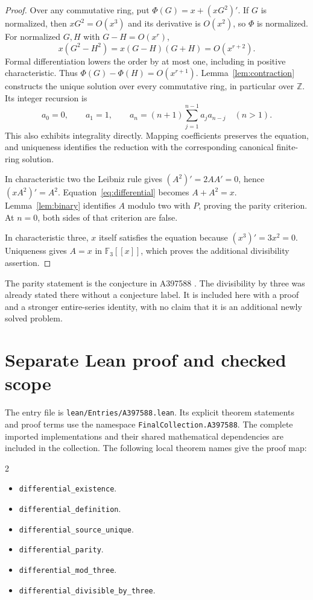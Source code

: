 \documentclass[11pt,a4paper]{article}
\theoremstyle{remark}
\newcommand{\Z}{\mathbb Z}
\newcommand{\F}{\mathbb F}
\newcommand{\ps}[1]{#1[[x]]}
\begin{document}
\begin{proof}
Over any commutative ring, put $\Phi(G)=x+(xG^2)'$. If $G$ is normalized,
then $xG^2=O(x^3)$ and its derivative is $O(x^2)$, so $\Phi$ is normalized.
For normalized $G,H$ with $G-H=O(x^r)$,
\[
 x(G^2-H^2)=x(G-H)(G+H)=O(x^{r+2}).
\]
Formal differentiation lowers the order by at most one, including in
positive characteristic. Thus $\Phi(G)-\Phi(H)=O(x^{r+1})$.
Lemma~\ref{lem:contraction} constructs the unique solution over every
commutative ring, in particular over $\Z$. Its integer recursion is
\[
 a_0=0,\qquad a_1=1,\qquad
 a_n=(n+1)\sum_{j=1}^{n-1}a_ja_{n-j}\quad(n>1).
\]
This also exhibits integrality directly. Mapping coefficients preserves
the equation, and uniqueness identifies the reduction with the
corresponding canonical finite-ring solution.

In characteristic two the Leibniz rule gives $(A^2)'=2AA'=0$, hence
$(xA^2)'=A^2$. Equation~\eqref{eq:differential} becomes $A+A^2=x$.
Lemma~\ref{lem:binary} identifies $A$ modulo two with $P$, proving the
parity criterion. At $n=0$, both sides of that criterion are false.

In characteristic three, $x$ itself satisfies the equation because
$(x^3)'=3x^2=0$. Uniqueness gives $A=x$ in $\ps{\F_3}$, which proves the
additional divisibility assertion.
\end{proof}

The parity statement is the conjecture in A397588 \cite{oeis588}.
The divisibility by three was already stated there without a conjecture
label. It is included here with a proof and a stronger entire-series
identity, with no claim that it is an additional newly solved problem.


\section{Separate Lean proof and checked scope}

The entry file is \nolinkurl{lean/Entries/A397588.lean}. Its explicit
theorem statements and proof terms use the namespace
\nolinkurl{FinalCollection.A397588}. The complete imported implementations
and their shared mathematical dependencies are included in the collection.
The following local theorem names give the proof map:

\begin{multicols}{2}\raggedright\begin{itemize}\setlength{\itemsep}{2pt}\setlength{\parsep}{0pt}
\item \nolinkurl{differential_existence}.
\item \nolinkurl{differential_definition}.
\item \nolinkurl{differential_source_unique}.
\item \nolinkurl{differential_parity}.
\item \nolinkurl{differential_mod_three}.
\item \nolinkurl{differential_divisible_by_three}.
\end{itemize}\end{multicols}
\end{document}
